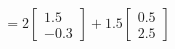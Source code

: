 \documentclass[preview]{standalone}
\begin{document}
\begin{align*}
= 2 \begin{bmatrix} 1.5 \\ -0.3 \end{bmatrix} + 1.5 \begin{bmatrix} 0.5 \\ 2.5 \end{bmatrix}
\end{align*}
\end{document}
